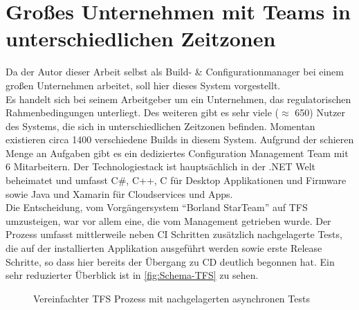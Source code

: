 \section{Großes Unternehmen mit Teams in unterschiedlichen Zeitzonen}
Da der Autor dieser Arbeit selbst als Build- \& Configurationmanager bei einem großen Unternehmen arbeitet, soll hier dieses System vorgestellt.\\
Es handelt sich bei seinem Arbeitgeber um ein Unternehmen, das regulatorischen Rahmenbedingungen unterliegt. Des weiteren gibt es sehr viele ($\approx$ 650) Nutzer des Systems, die sich in unterschiedlichen Zeitzonen befinden. Momentan existieren circa 1400 verschiedene Builds in diesem System. Aufgrund der schieren Menge an Aufgaben gibt es ein dediziertes Configuration Management Team mit 6 Mitarbeitern. Der Technologiestack ist hauptsächlich in der .NET Welt beheimatet und umfasst C\#, C++, C für Desktop Applikationen und Firmware sowie Java und Xamarin für Cloudservices und Apps.\\
Die Entscheidung, vom Vorgängersystem "`Borland StarTeam"' auf TFS umzusteigen, war vor allem eine, die vom Management getrieben wurde. Der Prozess umfasst mittlerweile neben CI Schritten zusätzlich nachgelagerte Tests, die auf der installierten Applikation ausgeführt werden sowie erste Release Schritte, so dass hier bereits der Übergang zu CD deutlich begonnen hat. Ein sehr reduzierter Überblick ist in \autoref{fig:Schema-TFS} zu sehen.
\begin{figure}[H]
  \centering
  \caption{Vereinfachter TFS Prozess mit nachgelagerten asynchronen Tests}\label{fig:Schema-TFS}
\end{figure}